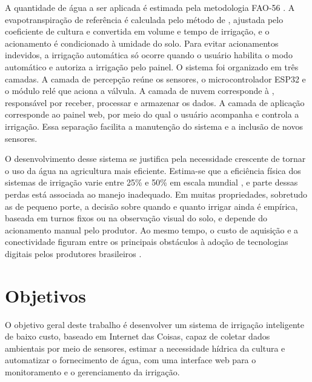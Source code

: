 A quantidade de água a ser aplicada é estimada pela metodologia FAO-56 \cite{allen1998}. A evapotranspiração de referência é calculada pelo método de , ajustada pelo coeficiente de cultura e convertida em volume e tempo de irrigação, e o acionamento é condicionado à umidade do solo. Para evitar acionamentos indevidos, a irrigação automática só ocorre quando o usuário habilita o modo automático e autoriza a irrigação pelo painel. O sistema foi organizado em três camadas. A camada de percepção reúne os sensores, o microcontrolador ESP32 e o módulo relé que aciona a válvula. A camada de nuvem corresponde à , responsável por receber, processar e armazenar os dados. A camada de aplicação corresponde ao painel web, por meio do qual o usuário acompanha e controla a irrigação. Essa separação facilita a manutenção do sistema e a inclusão de novos sensores.

O desenvolvimento desse sistema se justifica pela necessidade crescente de tornar o uso da água na agricultura mais eficiente. Estima-se que a eficiência física dos sistemas de irrigação varie entre 25\% e 50\% em escala mundial \cite{perezblanco2021zombie}, e parte dessas perdas está associada ao manejo inadequado. Em muitas propriedades, sobretudo as de pequeno porte, a decisão sobre quando e quanto irrigar ainda é empírica, baseada em turnos fixos ou na observação visual do solo, e depende do acionamento manual pelo produtor. Ao mesmo tempo, o custo de aquisição e a conectividade figuram entre os principais obstáculos à adoção de tecnologias digitais pelos produtores brasileiros \cite{bolfe2020precision}.

\section{Objetivos}

O objetivo geral deste trabalho é desenvolver um sistema de irrigação inteligente de baixo custo, baseado em Internet das Coisas, capaz de coletar dados ambientais por meio de sensores, estimar a necessidade hídrica da cultura e automatizar o fornecimento de água, com uma interface web para o monitoramento e o gerenciamento da irrigação.

